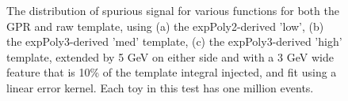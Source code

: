\begin{figure} 
\begin{center}

\caption{The distribution of spurious signal for various functions for both the GPR and raw template, using (a) the expPoly2-derived 'low', (b) the expPoly3-derived 'med' template, (c) the expPoly3-derived 'high' template, extended by 5 GeV on either side and with a 3 GeV wide feature that is 10\% of the template integral injected, and fit using a linear error kernel. Each toy in this test has one million events.}
\label{fig:linearkernel_lowpt_100k_Siginj}
\end{center}
\end{figure}


